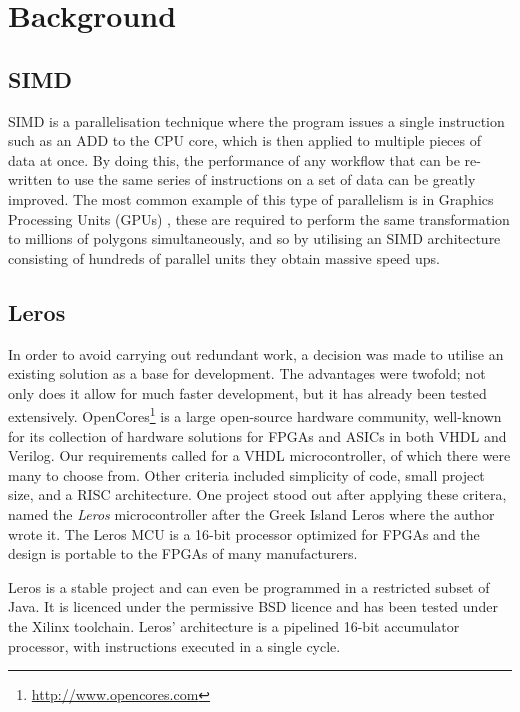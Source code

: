 \section{Background}
\subsection{SIMD}

SIMD is a parallelisation
technique where the program issues a single instruction such as an ADD to the
CPU core, which is then applied to multiple pieces of data at once.  By doing
this, the performance of any workflow that can be re-written to use the same series of instructions
on a set of data can be greatly improved.  The most common example of this type of
parallelism is in Graphics Processing Units (GPUs)
\cite{Fatahalian:2008:CLG:1400181.1400197}, these are required to perform the
same transformation to millions of polygons simultaneously, and so by utilising
an SIMD architecture consisting of hundreds of parallel units they
obtain massive speed ups.


\subsection{Leros}
In order to avoid carrying out redundant work, a decision was made to utilise an
existing solution as a base for development. The advantages were twofold; not
only
does it allow for much faster development, but it has already been tested
extensively.
 OpenCores\footnote{\url{http://www.opencores.com}}
is a large open-source hardware community, well-known for its collection of
hardware solutions for
FPGAs and ASICs in both VHDL and Verilog. Our requirements called for a VHDL
microcontroller, of which there were many to choose from. Other criteria
included
simplicity of code, small project size, and a RISC architecture. One project
stood out
after applying these critera, named the \emph{Leros} microcontroller after the
Greek Island Leros \cite{schoeberlleros} where the author wrote it.  The Leros
MCU is a 16-bit
processor optimized for FPGAs \cite{schoeberlleros} and the design is portable
to the FPGAs of many manufacturers.

Leros is a stable
project and can even be programmed in a restricted subset of Java. It is
licenced
under the permissive BSD licence and has been tested under the Xilinx toolchain.
Leros' architecture is a pipelined 16-bit accumulator
processor\cite{schoeberlleros},
with instructions executed in a single cycle.

